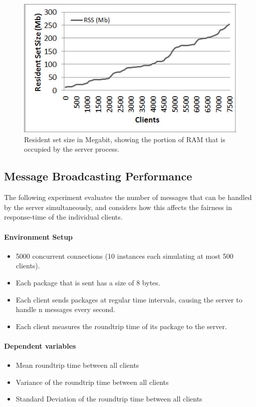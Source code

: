 \documentclass[bsc,frontabs,twoside,singlespacing,parskip,deptreport]{infthesis}     %
\begin{document}
\begin{figure}[H]
\centering
\includegraphics[scale=0.75]{images/test_CLIENT_RSS.jpg}
\caption{Resident set size in Megabit, showing the portion of RAM that is occupied by the server process.}
\label{fig:cpu_rss}
\end{figure}


\subsection{Message Broadcasting Performance}
The following experiment evaluates the number of messages that can be handled by the server simultaneously, and considers how this affects the fairness in response-time of the individual clients.

\paragraph*{Environment Setup}
\begin{itemize}
\item 5000 concurrent connections (10 instances each simulating at most 500 clients).
\item Each package that is sent has a size of 8 bytes.
\item Each client sends packages at regular time intervals, causing the server to handle n messages every second.
\item Each client measures the roundtrip time of its package to the server.
\end{itemize}

\paragraph*{Dependent variables}
\begin{itemize}
\item Mean roundtrip time between all clients
\item Variance of the roundtrip time between all clients
\item Standard Deviation of the roundtrip time between all clients
\end{itemize}
\end{document}
